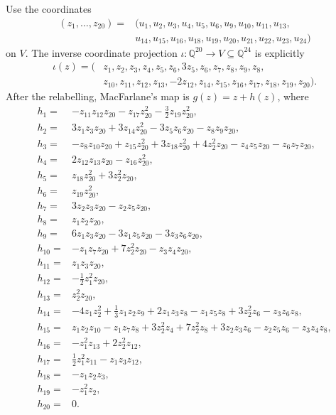 \documentclass[11pt]{article}
\theoremstyle{remark}
\newcommand{\Q}{\mathbb{Q}}
\begin{document}
Use the coordinates
\begin{equation}\label{eq:zcoords}
\begin{split}
(z_1,\ldots,z_{20})={}&(u_1,u_2,u_3,u_4,u_5,u_6,u_9,u_{10},u_{11},u_{13},\\
&u_{14},u_{15},u_{16},u_{18},u_{19},u_{20},u_{21},u_{22},u_{23},u_{24})
\end{split}
\end{equation}
on $V$. The inverse coordinate projection $\iota\colon\Q^{20}\to V\subseteq\Q^{24}$ is explicitly
\begin{equation}\label{eq:iota}
\begin{split}
\iota(z)=(&z_1,z_2,z_3,z_4,z_5,z_6,3z_5,z_6,z_7,z_8,z_9,z_8,\\
&z_{10},z_{11},z_{12},z_{13},-2z_{12},z_{14},z_{15},z_{16},z_{17},z_{18},z_{19},z_{20}).
\end{split}
\end{equation}
After the relabelling, MacFarlane's map is $g(z)=z+h(z)$, where
\begin{align*}
h_1={}&-z_{11}z_{12}z_{20}-z_{17}z_{20}^2-\tfrac32z_{19}z_{20}^2,\\
h_2={}&3z_1z_3z_{20}+3z_{14}z_{20}^2-3z_5z_6z_{20}-z_8z_9z_{20},\\
h_3={}&-z_8z_{10}z_{20}+z_{15}z_{20}^2+3z_{18}z_{20}^2+4z_2^2z_{20}-z_4z_5z_{20}-z_6z_7z_{20},\\
h_4={}&2z_{12}z_{13}z_{20}-z_{16}z_{20}^2,\\
h_5={}&z_{18}z_{20}^2+3z_2^2z_{20},\\
h_6={}&z_{19}z_{20}^2,\\
h_7={}&3z_2z_3z_{20}-z_2z_5z_{20},\\
h_8={}&z_1z_2z_{20},\\
h_9={}&6z_1z_3z_{20}-3z_1z_5z_{20}-3z_3z_6z_{20},\\
h_{10}={}&-z_1z_7z_{20}+7z_2^2z_{20}-z_3z_4z_{20},\\
h_{11}={}&z_1z_3z_{20},\\
h_{12}={}&-\tfrac12z_1^2z_{20},\\
h_{13}={}&z_2^2z_{20},\\
h_{14}={}&-4z_1z_2^2+\tfrac13z_1z_2z_9+2z_1z_3z_8-z_1z_5z_8+3z_2^2z_6-z_3z_6z_8,\\
h_{15}={}&z_1z_2z_{10}-z_1z_7z_8+3z_2^2z_4+7z_2^2z_8+3z_2z_3z_6-z_2z_5z_6-z_3z_4z_8,\\
h_{16}={}&-z_1^2z_{13}+2z_2^2z_{12},\\
h_{17}={}&\tfrac12z_1^2z_{11}-z_1z_3z_{12},\\
h_{18}={}&-z_1z_2z_3,\\
h_{19}={}&-z_1^2z_2,\\
h_{20}={}&0.
\end{align*}
\end{document}
